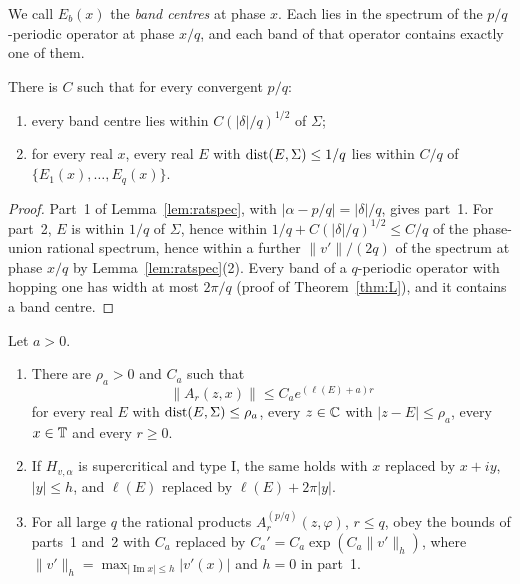 We call $E_b(x)$ the \emph{band centres} at phase $x$. Each lies in the spectrum of the $p/q$-periodic operator at phase $x/q$, and each band of that operator contains exactly one of them.

\begin{lemma}[Location]\label{lem:tI-loc}
There is $C$ such that for every convergent $p/q$:
\begin{enumerate}
\item every band centre lies within $C(|\delta|/q)^{1/2}$ of $\Sigma$;
\item for every real $x$, every real $E$ with $\operatorname{dist}(E,\Sigma)\le1/q$ lies within $C/q$ of $\{E_1(x),\dots,E_q(x)\}$.
\end{enumerate}
\end{lemma}

\begin{proof}
Part~1 of Lemma~\ref{lem:ratspec}, with $|\alpha-p/q|=|\delta|/q$, gives part~1. For part~2, $E$ is within $1/q$ of $\Sigma$, hence within $1/q+C(|\delta|/q)^{1/2}\le C/q$ of the phase-union rational spectrum, hence within a further $\|v'\|/(2q)$ of the spectrum at phase $x/q$ by Lemma~\ref{lem:ratspec}(2). Every band of a $q$-periodic operator with hopping one has width at most $2\pi/q$ (proof of Theorem~\ref{thm:L}), and it contains a band centre.
\end{proof}

\begin{lemma}\label{lem:tI-growth}
Let $a>0$.
\begin{enumerate}
\item There are $\rho_a>0$ and $C_a$ such that
\[
\|A_r(z,x)\|\le C_ae^{(\ell(E)+a)r}
\]
for every real $E$ with $\operatorname{dist}(E,\Sigma)\le\rho_a$, every $z\in\mathbb C$ with $|z-E|\le\rho_a$, every $x\in\mathbb T$ and every $r\ge0$.
\item If $H_{v,\alpha}$ is supercritical and type I, the same holds with $x$ replaced by $x+iy$, $|y|\le h$, and $\ell(E)$ replaced by $\ell(E)+2\pi|y|$.
\item For all large $q$ the rational products $A^{(p/q)}_r(z,\varphi)$, $r\le q$, obey the bounds of parts~1 and~2 with $C_a$ replaced by $C_a'=C_a\exp(C_a\|v'\|_h)$, where $\|v'\|_h=\max_{|\operatorname{Im}x|\le h}|v'(x)|$ and $h=0$ in part~1.
\end{enumerate}
\end{lemma}

